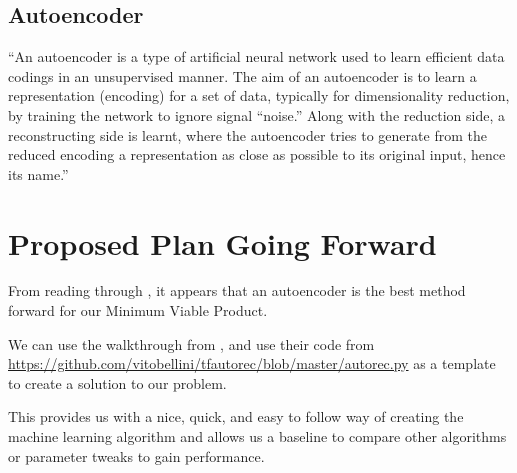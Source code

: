 \documentclass[10pt,a4paper]{article}
\begin{document}
\subsection{Autoencoder}
``An autoencoder is a type of artificial neural network used to learn efficient data codings in an unsupervised manner. The aim of an autoencoder is to learn a representation (encoding) for a set of data, typically for dimensionality reduction, by training the network to ignore signal “noise.” Along with the reduction side, a reconstructing side is learnt, where the autoencoder tries to generate from the reduced encoding a representation as close as possible to its original input, hence its name.'' \cite{wiki:autoencoder}

\section{Proposed Plan Going Forward}
From reading through \cite{bellini-howto,google-cloud-tensorflow,medium-deep-learning-recommendation,tensorflow-official-example}, it appears that an autoencoder is the best method forward for our Minimum Viable Product.

We can use the walkthrough from \cite{bellini-howto}, and use their code from \url{https://github.com/vitobellini/tfautorec/blob/master/autorec.py} as a template to create a solution to our problem.

This provides us with a nice, quick, and easy to follow way of creating the machine learning algorithm and allows us a baseline to compare other algorithms or parameter tweaks to gain performance.

\nocite{*}


\end{document}
